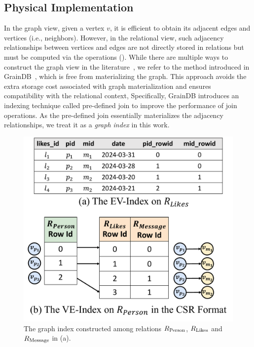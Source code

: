 

\subsection{Physical Implementation}
\label{sec:physical-operators}

In the graph view, given a vertex $v$, it is efficient to obtain its adjacent edges and vertices (i.e., neighbors). However, in the relational view, such adjacency relationships between vertices and edges are not directly stored in relations but must be computed via the \EVjoin operations (). While there are multiple ways to construct the graph view in the literature~\cite{gart,GRFusion}, we refer to the method introduced in GrainDB~\cite{graindb}, which is free from materializing the graph. This approach avoids the extra storage cost associated with graph materialization and ensures compatibility with the relational context,
Specifically, GrainDB introduces an indexing technique called pre-defined join to improve the performance of join operations. As the pre-defined join essentially materializes the adjacency relationships, we treat it as a \emph{graph index} in this work.

\begin{figure}
    \centering
    \includegraphics[width=.72\linewidth]{./figures/graph-index-likes.pdf}
    \caption{The graph index constructed among relations ${R_{\text{Person}}}$, ${R_{\text{Likes}}}$
    and ${R_{\text{Message}}}$ in (a).}
    \label{fig:graph-index}
\end{figure}

